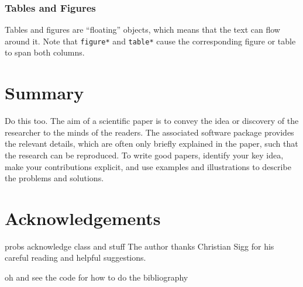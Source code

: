 \documentclass[10pt,conference,compsocconf]{IEEEtran}
\begin{document}
\subsubsection{Tables and Figures}

Tables and figures are ``floating'' objects, which means that the text
can flow around it.
Note
that \texttt{figure*} and \texttt{table*} cause the corresponding
figure or table to span both columns.



\section{Summary}
Do this too.
The aim of a scientific paper is to convey the idea or discovery of
the researcher to the minds of the readers. The associated software
package provides the relevant details, which are often only briefly
explained in the paper, such that the research can be reproduced.
To write good papers, identify your key idea, make your contributions
explicit, and use examples and illustrations to describe the problems
and solutions.

\section*{Acknowledgements}
probs acknowledge class and stuff
The author thanks Christian Sigg for his careful reading and helpful
suggestions.

oh and see the code for how to do the bibliography



\end{document}
